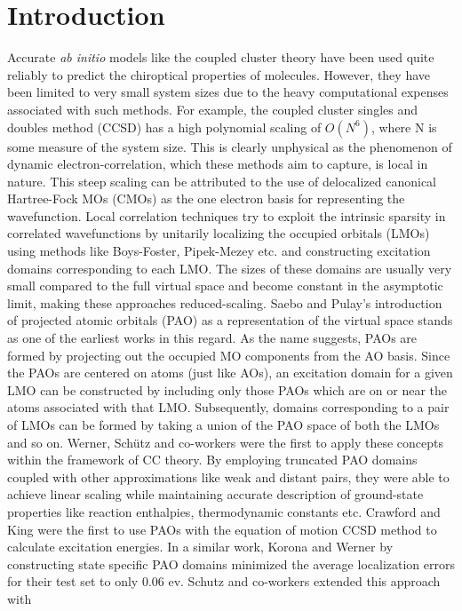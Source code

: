 \section{Introduction}
Accurate {\em ab initio} models like the coupled cluster theory have been used quite reliably to 
predict the chiroptical properties of molecules.\cite{} However, they have been limited to very 
small system sizes due to the heavy computational expenses associated with such methods. 
For example, the coupled cluster singles and doubles method (CCSD) has a high polynomial scaling of 
$O(N^6)$, where N is some measure of the system size. This is clearly unphysical as the phenomenon 
of dynamic electron-correlation, which these methods aim to capture, is local in nature.\cite{} This 
steep scaling can be attributed to the use of delocalized canonical Hartree-Fock MOs (CMOs) as the one 
electron basis for representing the wavefunction. Local correlation techniques try to exploit the intrinsic 
sparsity in correlated wavefunctions by unitarily localizing the occupied orbitals (LMOs) using methods 
like Boys-Foster, Pipek-Mezey etc\cite{}. and constructing excitation domains corresponding to each LMO. 
The sizes of these domains are usually very small compared to the full virtual space and become constant 
in the asymptotic limit, making these approaches reduced-scaling. Saebo and Pulay's introduction of projected 
atomic orbitals (PAO) as a representation of the virtual space stands as one of the earliest works in this 
regard\cite{}. As the name suggests, PAOs are formed by projecting out the occupied MO components from the 
AO basis. Since the PAOs are centered on atoms (just like AOs), an excitation domain for a given LMO can 
be constructed by including only those PAOs which are on or near the atoms associated with that LMO. 
Subsequently, domains corresponding to a pair of LMOs can be formed by taking a union of the PAO space of both 
the LMOs and so on. Werner, Sch{\"u}tz and co-workers \cite{} were the first to apply these concepts within 
the framework of CC theory. By employing truncated PAO domains coupled with other approximations like weak 
and distant pairs, they were able to achieve linear scaling while maintaining accurate description of 
ground-state properties like reaction enthalpies, thermodynamic constants etc.\cite{}  Crawford and King 
were the first to use PAOs with the equation of motion CCSD method to calculate excitation energies\cite{}. 
In a similar work, Korona and Werner\cite{} by constructing state specific PAO domains minimized the average 
localization errors for their test set to only 0.06 ev. Schutz and co-workers extended this approach with 
